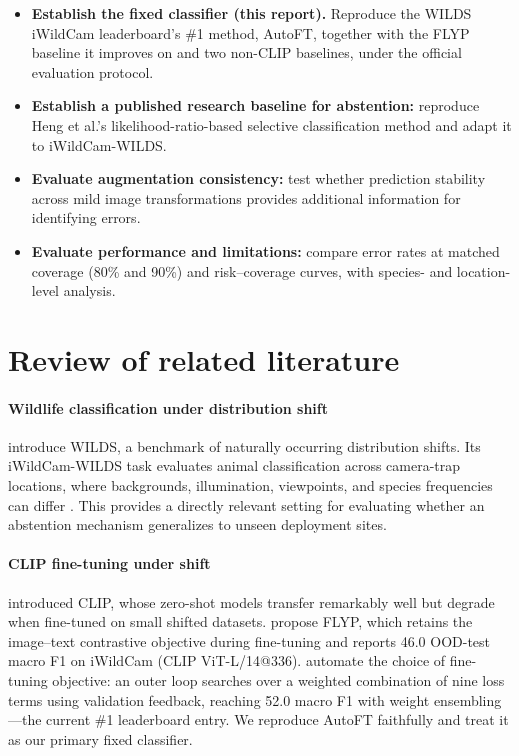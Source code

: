 \documentclass{article}
\begin{document}
\begin{itemize}
    \item \textbf{Establish the fixed classifier (this report).} Reproduce the WILDS
    iWildCam leaderboard's \#1 method, AutoFT, together with the FLYP baseline it improves
    on and two non-CLIP baselines, under the official evaluation protocol.
    \item \textbf{Establish a published research baseline for abstention:} reproduce Heng
    et al.'s likelihood-ratio-based selective classification method and adapt it to
    iWildCam-WILDS.
    \item \textbf{Evaluate augmentation consistency:} test whether prediction stability
    across mild image transformations provides additional information for identifying
    errors.
    \item \textbf{Evaluate performance and limitations:} compare error rates at matched
    coverage (80\% and 90\%) and risk--coverage curves, with species- and
    location-level analysis.
\end{itemize}

\section{Review of related literature}
\paragraph{Wildlife classification under distribution shift}
\citet{pmlr-v139-koh21a} introduce WILDS, a benchmark of naturally occurring distribution
shifts. Its iWildCam-WILDS task evaluates animal classification across camera-trap
locations, where backgrounds, illumination, viewpoints, and species frequencies can
differ \citep{beery2020iwildcam}. This provides a directly relevant setting for
evaluating whether an abstention mechanism generalizes to unseen deployment sites.

\paragraph{CLIP fine-tuning under shift}
\citet{radford2021learning} introduced CLIP, whose zero-shot models transfer remarkably
well but degrade when fine-tuned on small shifted datasets. \citet{goyal2023flyp} propose
FLYP, which retains the image--text contrastive objective during fine-tuning and reports
46.0 OOD-test macro F1 on iWildCam (CLIP ViT-L/14@336). \citet{choi2024autoft} automate
the choice of fine-tuning objective: an outer loop searches over a weighted combination
of nine loss terms using validation feedback, reaching 52.0 macro F1 with
\citet{wortsman2022wiseft} weight ensembling---the current \#1 leaderboard entry. We
reproduce AutoFT faithfully and treat it as our primary fixed classifier.
\end{document}

